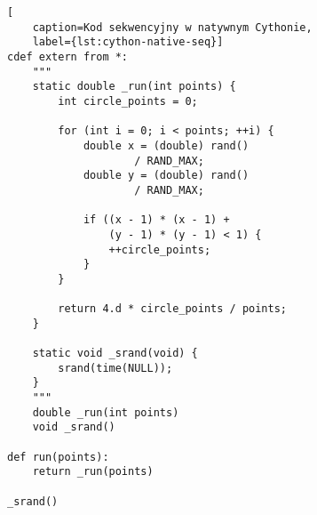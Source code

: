 \begin{lstlisting}[
    caption=Kod sekwencyjny w natywnym Cythonie,
    label={lst:cython-native-seq}]
cdef extern from *:
    """
    static double _run(int points) {
        int circle_points = 0;

        for (int i = 0; i < points; ++i) {
            double x = (double) rand()
                    / RAND_MAX;
            double y = (double) rand()
                    / RAND_MAX;

            if ((x - 1) * (x - 1) +
                (y - 1) * (y - 1) < 1) {
                ++circle_points;
            }
        }

        return 4.d * circle_points / points;
    }

    static void _srand(void) {
        srand(time(NULL));
    }
    """
    double _run(int points)
    void _srand()

def run(points):
    return _run(points)

_srand()
\end{lstlisting}

